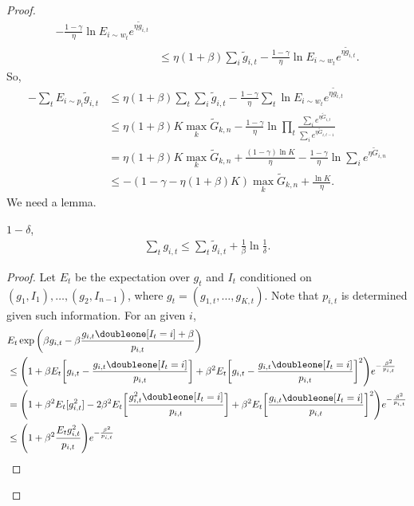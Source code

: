 \begin{proof}
\begin{align}
                - \frac{1-\gamma}{\eta} \ln E_{i\sim w_t} e^{\eta\tilde g_{i,t}} \\
            &\le \eta(1+\beta) \sum_{i} \tilde g_{i, t}
                - \frac{1-\gamma}{\eta} \ln E_{i\sim w_t} e^{\eta\tilde g_{i,t}}.
    \end{align}
    So,
    \begin{align}
        -\sum_t E_{i\sim p_t}\tilde g_{i, t}
            &\le \eta(1+\beta)\sum_t\sum_i \tilde g_{i, t}
                - \frac{1-\gamma}{\eta}\sum_t \ln E_{i\sim w_t} e^{\eta\tilde g_{i,t}} \\
            &\le \eta(1+\beta)K\max_k \tilde G_{k,n}
                - \frac{1-\gamma}{\eta} \ln\prod_t\frac{\sum_i e^{\eta\tilde G_{i,t}}}{\sum_i e^{\eta\tilde G_{i,t-1}}} \\
            &= \eta(1+\beta)K\max_k \tilde G_{k,n} + \frac{(1-\gamma)\ln K}{\eta}
                - \frac{1-\gamma}{\eta} \ln\sum_i e^{\eta\tilde G_{i,n}} \\
            &\le -(1-\gamma-\eta(1+\beta)K)\max_k \tilde G_{k,n} + \frac{\ln K}{\eta}.
    \end{align}
    We need a lemma.
    \begin{lem}
        \wprob $1-\delta$,
        \begin{align}
            \sum_t g_{i,t}\le \sum_t \tilde g_{i,t} + \frac{1}{\beta}\ln \frac{1}{\delta}.
        \end{align}
    \end{lem}
    \begin{proof}
        Let $E_t$ be the expectation over $g_t$ and $I_t$ conditioned on
        $(g_1,I_1), \dots,(g_2,I_{n-1})$,
        where $g_t=(g_{1,t},\dots,g_{K,t})$.
        Note that $p_{i,t}$ is determined given such information.
        For an given $i$,
        \begin{align}
            &E_t \exp\bigg(\beta g_{i,t}-\beta\frac{g_{i,t}\doubleone[I_t=i]+\beta}{p_{i,t}}\bigg) \\
            &\le\Bigg(1+\beta E_t\bigg[g_{i,t}-\frac{g_{i,t}\doubleone[I_t=i]}{p_{i,t}}\bigg]
                +\beta^2 E_t\bigg[g_{i,t}-\frac{g_{i,t}\doubleone[I_t=i]}{p_{i,t}}\bigg]^2\Bigg)e^{-\frac{\beta^2}{p_{i,t}}} \\
            &=\Bigg(1+\beta^2 E_t[g_{i,t}^2] - 2\beta^2 E_t\bigg[\frac{g_{i,t}^2\doubleone[I_t=i]}{p_{i,t}}\bigg]
                +\beta^2 E_t\bigg[\frac{g_{i,t}\doubleone[I_t=i]}{p_{i,t}}\bigg]^2\Bigg)e^{-\frac{\beta^2}{p_{i,t}}} \\
            &\le\Bigg(1+\beta^2 \frac{E_t g_{i,t}^2}{p_{i,t}}\Bigg)e^{-\frac{\beta^2}{p_{i,t}}} \\

\end{align}
\end{proof}
\end{proof}
